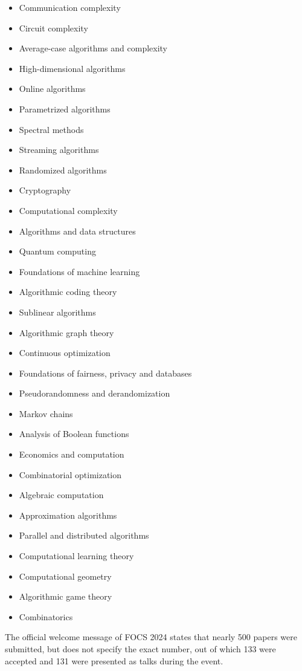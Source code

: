 \documentclass[
	a4paper, %
	10pt, %
	unnumberedsections, %
	twoside, %
]{LTJournalArticle}
\begin{document}
\begin{itemize}
	\item Communication complexity
	\item Circuit complexity
	\item Average-case algorithms and complexity
	\item High-dimensional algorithms
	\item Online algorithms
	\item Parametrized algorithms
	\item Spectral methods
	\item Streaming algorithms
	\item Randomized algorithms
	\item Cryptography
	\item Computational complexity
	\item Algorithms and data structures
	\item Quantum computing
	\item Foundations of machine learning
	\item Algorithmic coding theory
	\item Sublinear algorithms
	\item Algorithmic graph theory
	\item Continuous optimization
	\item Foundations of fairness, privacy and databases
	\item Pseudorandomness and derandomization
	\item Markov chains
	\item Analysis of Boolean functions
	\item Economics and computation
	\item Combinatorial optimization
	\item Algebraic computation
	\item Approximation algorithms
	\item Parallel and distributed algorithms
	\item Computational learning theory
	\item Computational geometry
	\item Algorithmic game theory
	\item Combinatorics
\end{itemize}

The official welcome message of FOCS 2024 states that nearly 500 papers were submitted, but does not specify the exact number, out of which 133
were accepted and 131 were presented as talks during the event.
\end{document}
